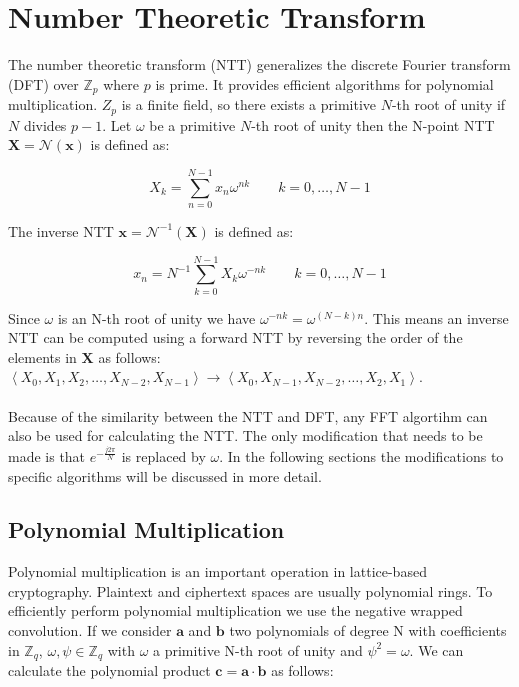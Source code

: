 \documentclass[english,master=eelt,masteroption=ec]{kulemt}
\begin{document}
\FloatBarrier

\section{Number Theoretic Transform}

The number theoretic transform (NTT) generalizes the discrete Fourier transform (DFT) over $\mathbb{Z}_p$ where $p$ is prime.
It provides efficient algorithms for polynomial multiplication. \cite{cryptoeprint:2016/504}
$Z_p$ is a finite field, so there exists a primitive $N$-th root of unity if $N$ divides $p-1$.
Let $\omega$ be a primitive $N$-th root of unity then the N-point NTT $\mathbf{X}=\mathcal{N}\left(\mathbf{x}\right)$ is defined as:

\begin{equation}
\label{eq:ntt}
X_k = \sum_{n=0}^{N-1} x_n \omega^{nk} \qquad k=0,\ldots,N-1
\end{equation}

The inverse NTT $\mathbf{x}=\mathcal{N}^{-1}\left(\mathbf{X}\right)$ is defined as:

\begin{equation}
x_n = N^{-1}\sum_{k=0}^{N-1} X_k \omega^{-nk} \qquad k=0,\ldots,N-1
\end{equation}

Since $\omega$ is an N-th root of unity we have $\omega^{-nk} = \omega^{(N-k)n}$. This means an inverse NTT can be computed using a forward NTT by reversing the order of the elements in $\mathbf{X}$ as follows: $\left \langle X_0, X_1, X_2, \ldots, X_{N-2}, X_{N-1}  \right \rangle \rightarrow \left \langle X_0, X_{N-1}, X_{N-2}, \ldots, X_2, X_1 \right \rangle$.
\\\\
Because of the similarity between the NTT and DFT, any FFT algortihm can also be used for calculating the NTT.
The only modification that needs to be made is that $e^{-\frac{j2\pi}{N}}$ is replaced by $\omega$. \cite{1162555}
In the following sections the modifications to specific algorithms will be discussed in more detail.

\subsection{Polynomial Multiplication}
Polynomial multiplication is an important operation in lattice-based cryptography. Plaintext and ciphertext spaces are usually polynomial rings. To efficiently perform polynomial multiplication we use the negative wrapped convolution. \cite{cryptoeprint:2015/382} If we consider $\mathbf{a}$ and $\mathbf{b}$ two polynomials of degree N with coefficients in $\mathbb{Z}_q$, $\omega, \psi \in \mathbb{Z}_q$ with $\omega$ a primitive N-th root of unity and $\psi^2 = \omega$. We can calculate the polynomial product $\mathbf{c} = \mathbf{a} \cdot \mathbf{b}$ as follows:
\end{document}
